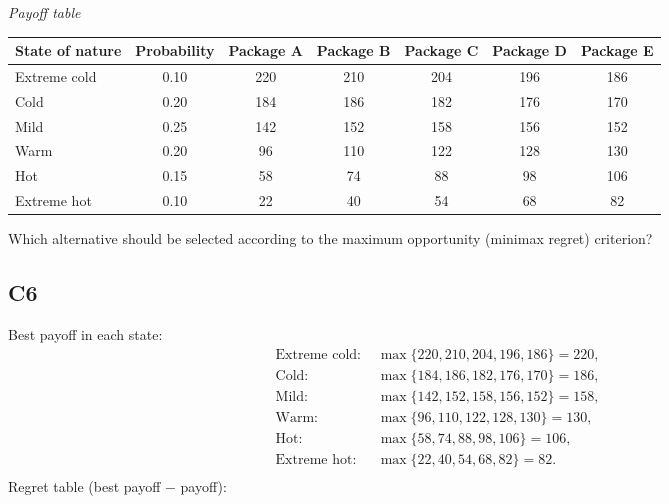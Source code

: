 \begin{ExamProblems}
		\begin{center}
			\textit{Payoff table}
			\begin{tabular}{l c c c c c c}
				\toprule
				State of nature & Probability & Package A & Package B & Package C & Package D & Package E \\
				\midrule
				Extreme cold & 0.10 & 220 & 210 & 204 & 196 & 186 \\
				Cold & 0.20 & 184 & 186 & 182 & 176 & 170 \\
				Mild & 0.25 & 142 & 152 & 158 & 156 & 152 \\
				Warm & 0.20 & 96 & 110 & 122 & 128 & 130 \\
				Hot & 0.15 & 58 & 74 & 88 & 98 & 106 \\
				Extreme hot & 0.10 & 22 & 40 & 54 & 68 & 82 \\
				\bottomrule
			\end{tabular}
		\end{center}

		Which alternative should be selected according to the maximum opportunity (minimax regret) criterion?

		\subsection*{C6}
		Best payoff in each state:
		\[
		\begin{aligned}
			\text{Extreme cold: } &\max\{220, 210, 204, 196, 186\} = 220, \\
			\text{Cold: } &\max\{184, 186, 182, 176, 170\} = 186, \\
			\text{Mild: } &\max\{142, 152, 158, 156, 152\} = 158, \\
			\text{Warm: } &\max\{96, 110, 122, 128, 130\} = 130, \\
			\text{Hot: } &\max\{58, 74, 88, 98, 106\} = 106, \\
			\text{Extreme hot: } &\max\{22, 40, 54, 68, 82\} = 82. \\
		\end{aligned}
		\]
		Regret table (best payoff $-$ payoff):
		

\end{ExamProblems}
